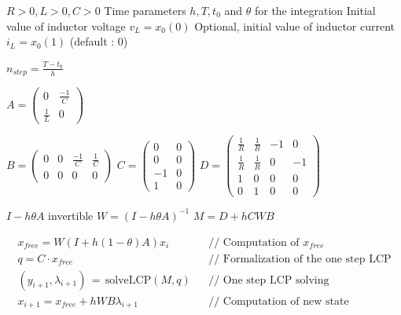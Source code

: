 \documentclass[10pt]{article}
\begin{document}
\begin{algorithm}
\caption{Integration of the electrical oscillator with 4 diodes bridge full-wave rectifier
through a fixed Moreau time stepping scheme}
\begin{algorithmic}

\REQUIRE $R > 0 , L > 0 , C > 0$
\REQUIRE Time parameters $h,T,t_0$ and $\theta$ for the integration
\REQUIRE Initial value of inductor voltage $v_L = x_0(0)$
\REQUIRE Optional, initial value  of inductor current $i_L = x_0(1)$ (default : 0)

\STATE $n_{step} = \frac{T - t_0}{h}$

\STATE $A = \left( \begin{array}{cc}
0 & \frac{-1}{C}\\
\frac{1}{L} & 0
\end{array} \right)$

\STATE $B = \left( \begin{array}{cccc}
0 & 0 & \frac{-1}{C} & \frac{1}{C}\\
0 & 0 & 0 & 0
\end{array} \right)$
\STATE $C = \left( \begin{array}{cc}
0 & 0\\
0 & 0\\
-1 & 0\\
1 & 0
\end{array} \right)$
\STATE $D = \left( \begin{array}{cccc}
\frac{1}{R} & \frac{1}{R} & -1 & 0\\
\frac{1}{R} & \frac{1}{R} & 0 & -1\\
1 & 0 & 0 & 0\\
0 & 1 & 0 & 0
\end{array} \right)$

\REQUIRE $I - h \theta A$ invertible
\STATE $W = (I - h \theta A)^{-1}$
\STATE $M = D + h C W B$

\STATE \begin{eqnarray*}
x_{free} = W (I + h (1 - \theta) A) x_i && \textrm{// Computation of $x_{free}$} \\
q = C \cdot x_{free} &&  \textrm{// Formalization of the one step LCP} \\
(y_{i+1},\lambda_{i+1})\,=\,\textrm{solveLCP}(M,q) &&  \textrm{// One step LCP solving} \\
x_{i+1} = x_{free} + h W B \lambda_{i+1} &&  \textrm{// Computation of new state}
\end{eqnarray*}
\ENDFOR

\end{algorithmic}
\end{algorithm}
\end{document}
